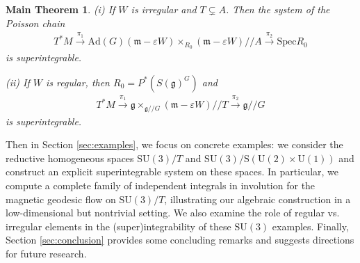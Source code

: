 \documentclass[11pt]{amsart}
\newtheorem*{theorem*}{Main Theorem}
\theoremstyle{definition}
\theoremstyle{plain}
\theoremstyle{conclusion}
\begin{document}
\begin{theorem*}
(i) If $W$ is irregular and $T \subsetneq A$. Then the system of the Poisson chain \begin{align}
    T^*M\xrightarrow{\pi_1}\mathrm{Ad}(G)(\mathfrak{m} - \varepsilon W)\times_{R_0}(\mathfrak{m} - \varepsilon W)//A \xrightarrow{\pi_2}\mathrm{Spec} R_0  \label{eq:irr0}
\end{align} is superintegrable.

(ii) If $W$ is regular, then $R_0  = P^*\left(S(\mathfrak{g})^G\right)$ and \begin{align}
    T^*M\xrightarrow{\pi_1}  \mathfrak{g}  \times_{\mathfrak{g}//G} (\mathfrak{m} - \varepsilon W)//T \xrightarrow{\pi_2}\mathfrak{g}//G  \label{eq:re1}
\end{align} is superintegrable.
\end{theorem*} %
Then in Section \ref{sec:examples}, we focus on concrete examples: we consider the reductive homogeneous spaces $ \mathrm{SU}(3)/T $ and $\mathrm{SU}(3)/\mathrm{S}(\mathrm{U} (2) \times \mathrm{U}(1))$ and construct an explicit superintegrable system on these spaces. In particular, we compute a complete family of independent integrals in involution for the magnetic geodesic flow on $\mathrm{SU}(3)/T $, illustrating our algebraic construction in a low-dimensional but nontrivial setting. We also examine the role of regular vs. irregular elements in the (super)integrability of these $\mathrm{SU}(3)$ examples. Finally, Section \ref{sec:conclusion} provides some concluding remarks and suggests directions for future research.


\end{document}
